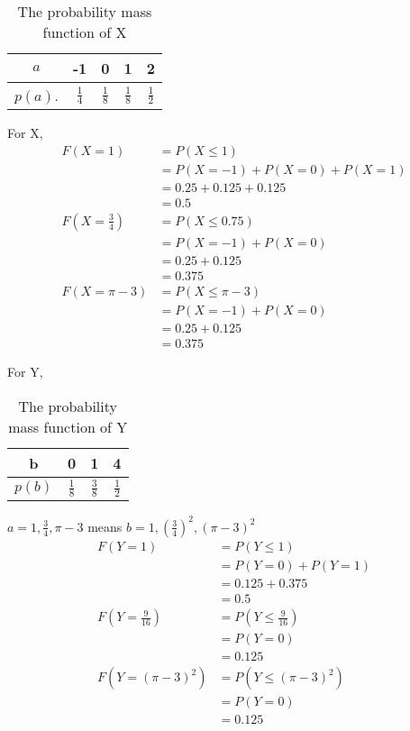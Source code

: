 \documentclass[11pt]{article} %
\begin{document}
\begin{table}[h!]
\begin{center}
\begin{tabular}{c|cccc} \hline
$a$ & -1 & 0 & 1 & 2 \\ \hline
$p(a)$. & $\frac{1}{4}$ & $\frac{1}{8}$ & $\frac{1}{8}$ & $\frac{1}{2}$ \\ \hline
\end{tabular}
\caption{The probability mass function of X}
\label{ta1}
\end{center}
\end{table}

For X, 
\begin{align*}
F(X=1) & = P(X\leq 1) \\
& = P(X=-1) + P(X=0) + P(X=1) \\
& = 0.25 + 0.125 + 0.125 \\
& = 0.5 \\
F(X=\frac{3}{4}) & = P(X\leq 0.75) \\
&= P(X=-1) + P(X=0) \\
& = 0.25 + 0.125  \\
& = 0.375 \\
F(X=\pi - 3) & = P(X\leq \pi -3) \\
&= P(X=-1) + P(X=0)  \\
& = 0.25 + 0.125 \\
& = 0.375
\end{align*}

For Y, 
\begin{table}[h!]
\begin{center}
\begin{tabular}{c|ccc} \hline
b & 0 & 1 & 4 \\ \hline
$p(b)$ & $\frac{1}{8}$ & $\frac{3}{8}$ & $\frac{1}{2}$ \\ \hline
\end{tabular}
\caption{The probability mass function of Y}
\label{ta1}
\end{center}
\end{table}
$a=1, \frac{3}{4}, \pi-3$ means $b = 1, (\frac{3}{4})^2, (\pi - 3)^2$
\begin{align*}
F(Y=1) & = P(Y\leq 1) \\
& = P(Y=0) + P(Y=1) \\
& = 0.125 + 0.375 \\
& = 0.5 \\
F(Y=\frac{9}{16}) & = P(Y\leq \frac{9}{16}) \\
&=  P(Y=0) \\
& = 0.125  \\
F(Y=(\pi -3)^2) & = P(Y\leq (\pi -3)^2) \\
&= P(Y=0)  \\
& =  0.125 \\
\end{align*}
\end{document}
